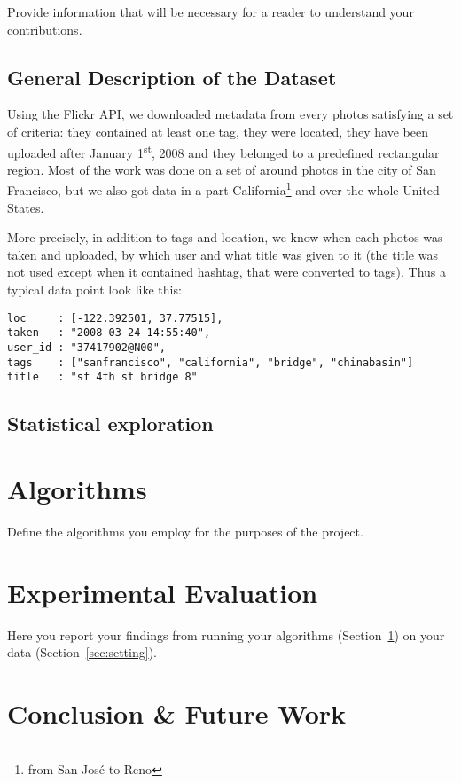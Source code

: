 Provide information that will be necessary for a reader to understand your contributions.

\subsection{General Description of the Dataset}

Using the Flickr API, we downloaded metadata from every photos satisfying a
set of criteria: they contained at least one tag, they were located, they have
been uploaded after January 1\textsuperscript{st}, 2008 and they belonged to a
predefined rectangular region. Most of the work was done on a set of around
 photos in the city of San Francisco, but we also got data in
a part California\footnote{from San José to Reno} and over the whole United
States.

More precisely, in addition to tags and location, we know when each photos was
taken and uploaded, by which user and what title was given to it (the title
was not used except when it contained hashtag, that were converted to tags).
Thus a typical data point look like this:

\vspace{\baselineskip}
{\centering\begin{minipage}{0.7\linewidth}
  \begin{Verbatim}[frame=none, gobble=0]
loc     : [-122.392501, 37.77515],
taken   : "2008-03-24 14:55:40",
user_id : "37417902@N00",
tags    : ["sanfrancisco", "california", "bridge", "chinabasin"]
title   : "sf 4th st bridge 8"
  \end{Verbatim}
\end{minipage}\par}



\subsection{Statistical exploration}

\section{Algorithms}
\label{sec:algorithms}

Define the algorithms you employ for the purposes of the project.

\section{Experimental Evaluation}

Here you report your findings from running your algorithms
(Section~\ref{sec:algorithms}) on your data (Section~\ref{sec:setting}).

\section{Conclusion \& Future Work}

\balance{}

